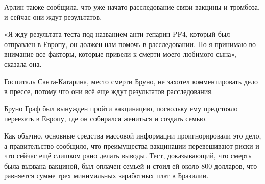{Арлин также сообщила, что уже начато расследование связи вакцины и тромбоза, и
сейчас они ждут результатов.

«Я жду результата теста под названием анти-гепарин PF4, который был отправлен в
Европу, он должен нам помочь в расследовании. Но я принимаю во внимание все
факторы, которые привели к смерти моего любимого сына», - сказала она.

Госпиталь Санта-Катарина, место смерти Бруно, не захотел комментировать дело в
прессе, потому что они всё еще ждут результатов расследования.

Бруно Граф был вынужден пройти вакцинацию, поскольку ему предстояло переехать в
Европу, где он собирался жениться и создать семью.

Как обычно, основные средства массовой информации проигнорировали это дело, а
правительство сообщило, что преимущества вакцинации перевешивают риски и что
сейчас ещё слишком рано делать выводы. Тест, доказывающий, что смерть была
вызвана вакциной, был оплачен семьей и стоил ей около 800 долларов, что
равняется сумме трех минимальных заработных плат в Бразилии.

}

